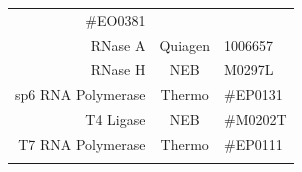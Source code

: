 \documentclass[11pt,singlespacinge,twoside]{reedthesis} %
\begin{document}
\begin{longtable}[]{@{}rcl@{}}
\begin{minipage}[t]{0.16\columnwidth}
\#EO0381\strut
\end{minipage}\tabularnewline
\begin{minipage}[t]{0.25\columnwidth}\raggedleft
RNase A\strut
\end{minipage} & \begin{minipage}[t]{0.50\columnwidth}\centering
Quiagen\strut
\end{minipage} & \begin{minipage}[t]{0.16\columnwidth}\raggedright
1006657\strut
\end{minipage}\tabularnewline
\begin{minipage}[t]{0.25\columnwidth}\raggedleft
RNase H\strut
\end{minipage} & \begin{minipage}[t]{0.50\columnwidth}\centering
NEB\strut
\end{minipage} & \begin{minipage}[t]{0.16\columnwidth}\raggedright
M0297L\strut
\end{minipage}\tabularnewline
\begin{minipage}[t]{0.25\columnwidth}\raggedleft
sp6 RNA Polymerase\strut
\end{minipage} & \begin{minipage}[t]{0.50\columnwidth}\centering
Thermo\strut
\end{minipage} & \begin{minipage}[t]{0.16\columnwidth}\raggedright
\#EP0131\strut
\end{minipage}\tabularnewline
\begin{minipage}[t]{0.25\columnwidth}\raggedleft
T4 Ligase\strut
\end{minipage} & \begin{minipage}[t]{0.50\columnwidth}\centering
NEB\strut
\end{minipage} & \begin{minipage}[t]{0.16\columnwidth}\raggedright
\#M0202T\strut
\end{minipage}\tabularnewline
\begin{minipage}[t]{0.25\columnwidth}\raggedleft
T7 RNA Polymerase\strut
\end{minipage} & \begin{minipage}[t]{0.50\columnwidth}\centering
Thermo\strut
\end{minipage} & \begin{minipage}[t]{0.16\columnwidth}\raggedright
\#EP0111\strut
\end{minipage}\tabularnewline
\begin{minipage}[t]{0.25\columnwidth}\raggedleft

\end{minipage}
\end{longtable}
\end{document}

